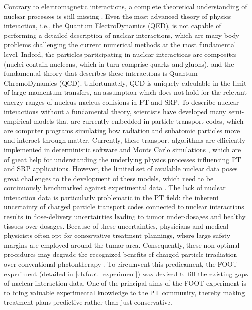 Contrary to electromagnetic interactions, a complete theoretical understanding of nuclear processes is still missing \cite{10.3389/fonc.2016.00065}. Even the most advanced theory of physics interaction, i.e., the Quantum ElectroDynamics (QED), is not capable of performing a detailed description of nuclear interactions, which are many-body problems challenging the current numerical methods at the most fundamental level. Indeed, the particles participating in nuclear interactions are composites (nuclei contain nucleons, which in turn comprise quarks and gluons), and the fundamental theory that describes these interactions is Quantum ChromoDynamics (QCD). Unfortunately, QCD is uniquely calculable in the limit of large momentum transfers, an assumption which does not hold for the relevant energy ranges of nucleus-nucleus collisions in PT and SRP. To describe nuclear interactions without a fundamental theory, scientists have developed many semi-empirical models that are currently embedded in particle transport codes, which are computer programs simulating how radiation and subatomic particles move and interact through matter. Currently, these transport algorithms are efficiently implemented in deterministic software and Monte Carlo simulations \cite{MonteCarloinHeavyChargedParticleTherapy}, which are of great help for understanding the underlying physics processes influencing PT and SRP applications. However, the limited set of available nuclear data \cite{NORBURY2012315} poses great challenges to the development of these models, which need to be continuously benchmarked against experimental data \cite{SIHVER20071320}. The lack of nuclear interaction data is particularly problematic in the PT field: the inherent uncertainty of charged particle transport codes connected to nuclear interactions results in dose-delivery uncertainties leading to tumor under-dosages and healthy tissues over-dosages. Because of these uncertainties, physicians and medical physicists often opt for conservative treatment plannings, where large safety margins are employed around the tumor area. Consequently, these non-optimal procedures may degrade the recognized benefits of charged particle irradiation over conventional photontherapy \cite{rangeVerification}. To circumvent this predicament, the FOOT experiment (detailed in \autoref{ch:foot_experiment}) was devised to fill the existing gaps of nuclear interaction data. One of the principal aims of the FOOT experiment is to bring valuable experimental knowledge to the PT community, thereby making treatment plans predictive rather than just conservative.

